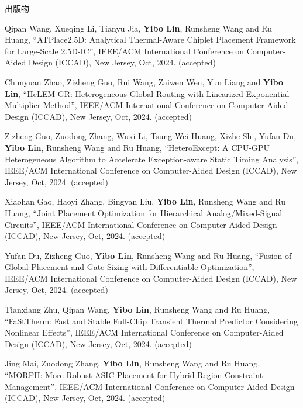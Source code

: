 \begin{rSection}{出版物}
\begin{description}[font=\normalfont, rightmargin=2em]
\item[{[C110]}]{
        Qipan Wang, Xueqing Li, Tianyu Jia, \textbf{Yibo Lin}, Runsheng Wang and Ru Huang, 
    ``ATPlace2.5D: Analytical Thermal-Aware Chiplet Placement Framework for Large-Scale 2.5D-IC'', 
    IEEE/ACM International Conference on Computer-Aided Design (ICCAD), New Jersey, Oct, 2024.
    (accepted)
}
            

\item[{[C109]}]{
        Chunyuan Zhao, Zizheng Guo, Rui Wang, Zaiwen Wen, Yun Liang and \textbf{Yibo Lin}, 
    ``HeLEM-GR: Heterogeneous Global Routing with Linearized Exponential Multiplier Method'', 
    IEEE/ACM International Conference on Computer-Aided Design (ICCAD), New Jersey, Oct, 2024.
    (accepted)
}
            

\item[{[C108]}]{
        Zizheng Guo, Zuodong Zhang, Wuxi Li, Tsung-Wei Huang, Xizhe Shi, Yufan Du, \textbf{Yibo Lin}, Runsheng Wang and Ru Huang, 
    ``HeteroExcept: A CPU-GPU Heterogeneous Algorithm to Accelerate Exception-aware Static Timing Analysis'', 
    IEEE/ACM International Conference on Computer-Aided Design (ICCAD), New Jersey, Oct, 2024.
    (accepted)
}
            

\item[{[C107]}]{
        Xiaohan Gao, Haoyi Zhang, Bingyan Liu, \textbf{Yibo Lin}, Runsheng Wang and Ru Huang, 
    ``Joint Placement Optimization for Hierarchical Analog/Mixed-Signal Circuits'', 
    IEEE/ACM International Conference on Computer-Aided Design (ICCAD), New Jersey, Oct, 2024.
    (accepted)
}
            

\item[{[C106]}]{
        Yufan Du, Zizheng Guo, \textbf{Yibo Lin}, Runsheng Wang and Ru Huang, 
    ``Fusion of Global Placement and Gate Sizing with Differentiable Optimization'', 
    IEEE/ACM International Conference on Computer-Aided Design (ICCAD), New Jersey, Oct, 2024.
    (accepted)
}
            

\item[{[C105]}]{
        Tianxiang Zhu, Qipan Wang, \textbf{Yibo Lin}, Runsheng Wang and Ru Huang, 
    ``FaStTherm: Fast and Stable Full-Chip Transient Thermal Predictor Considering Nonlinear Effects'', 
    IEEE/ACM International Conference on Computer-Aided Design (ICCAD), New Jersey, Oct, 2024.
    (accepted)
}
            

\item[{[C104]}]{
        Jing Mai, Zuodong Zhang, \textbf{Yibo Lin}, Runsheng Wang and Ru Huang, 
    ``MORPH: More Robust ASIC Placement for Hybrid Region Constraint Management'', 
    IEEE/ACM International Conference on Computer-Aided Design (ICCAD), New Jersey, Oct, 2024.
    (accepted)
}
            


\end{description}
\end{rSection}
